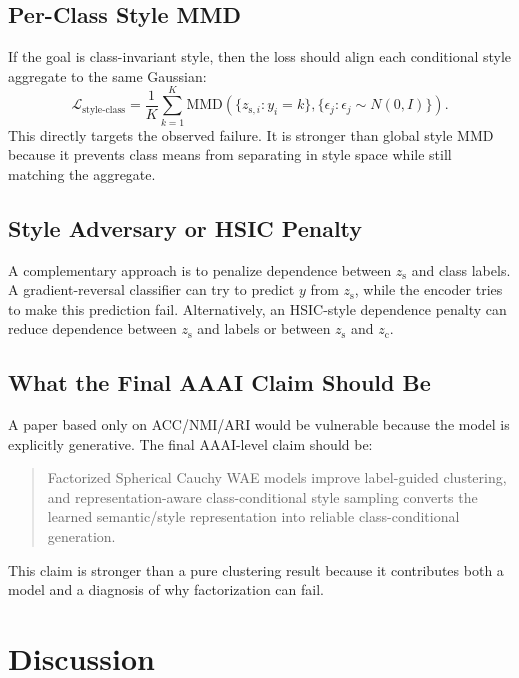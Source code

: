 \documentclass[10pt]{article}
\newcommand{\zc}{z_{\mathrm{c}}}
\newcommand{\zs}{z_{\mathrm{s}}}
\begin{document}
\subsection{Per-Class Style MMD}

If the goal is class-invariant style, then the loss should align each conditional style aggregate to the same Gaussian:
\begin{equation}
    \mathcal{L}_{\mathrm{style\text{-}class}}
    =
    \frac{1}{K}\sum_{k=1}^{K}
    \mathrm{MMD}\left(
        \{z_{\mathrm{s},i}:y_i=k\},
        \{\epsilon_j:\epsilon_j\sim N(0,I)\}
    \right).
\end{equation}
This directly targets the observed failure. It is stronger than global style MMD because it prevents class means from separating in style space while still matching the aggregate.

\subsection{Style Adversary or HSIC Penalty}

A complementary approach is to penalize dependence between $\zs$ and class labels. A gradient-reversal classifier can try to predict $y$ from $\zs$, while the encoder tries to make this prediction fail. Alternatively, an HSIC-style dependence penalty \citep{gretton2005measuring} can reduce dependence between $\zs$ and labels or between $\zs$ and $\zc$.

\subsection{What the Final AAAI Claim Should Be}

A paper based only on ACC/NMI/ARI would be vulnerable because the model is explicitly generative. The final AAAI-level claim should be:
\begin{quote}
    Factorized Spherical Cauchy WAE models improve label-guided clustering, and representation-aware class-conditional style sampling converts the learned semantic/style representation into reliable class-conditional generation.
\end{quote}
This claim is stronger than a pure clustering result because it contributes both a model and a diagnosis of why factorization can fail.

\section{Discussion}
\end{document}
